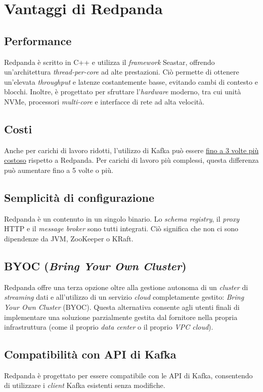 \section{Vantaggi di Redpanda}
\subsection{Performance}
Redpanda è scritto in C++ e utilizza il \textit{framework} Seastar, offrendo un'architettura \textit{thread-per-core} ad alte prestazioni.
Ciò permette di ottenere un'elevata \textit{throughput} e latenze costantemente basse, evitando cambi di contesto e blocchi.
Inoltre, è progettato per sfruttare l'\textit{hardware} moderno, tra cui unità NVMe, processori \textit{multi-core} e interfacce di rete ad alta velocità.

\subsection{Costi}
Anche per carichi di lavoro ridotti, l'utilizzo di Kafka può essere \href{https://redpanda.com/blog/is-redpanda-better-than-kafka-tco-comparison}{fino a 3 volte più costoso} rispetto a Redpanda. Per carichi di lavoro più complessi, questa differenza può aumentare fino a 5 volte o più.\\

\subsection{Semplicità di configurazione}
Redpanda è un contenuto in un singolo binario. Lo \textit{schema registry}, il \textit{proxy} HTTP e il \textit{message broker} sono tutti integrati. Ciò significa che non ci sono dipendenze da JVM, ZooKeeper o KRaft.

\subsection{BYOC (\textit{Bring Your Own Cluster})}
Redpanda offre una terza opzione oltre alla gestione autonoma di un \textit{cluster} di \textit{streaming}
dati e all'utilizzo di un servizio \textit{cloud} completamente gestito: \textit{Bring Your Own Cluster} (BYOC).
Questa alternativa consente agli utenti finali di implementare una soluzione parzialmente gestita dal fornitore nella propria infrastruttura (come il proprio \textit{data center}
o il proprio \textit{VPC cloud}).\\

\subsection{Compatibilità con API di Kafka}
Redpanda è progettato per essere compatibile con le API di Kafka, consentendo di utilizzare i \textit{client} Kafka esistenti senza modifiche.

